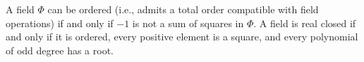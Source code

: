A field $\Phi$ can be ordered (i.e., admits a total order compatible with field operations) if and only if $-1$ is not a sum of squares in $\Phi$. A field is real closed if and only if it is ordered, every positive element is a square, and every polynomial of odd degree has a root.
